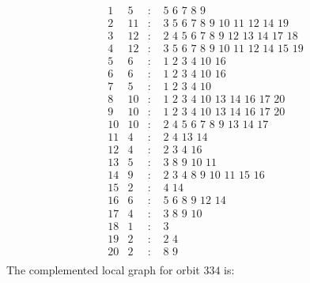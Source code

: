 \documentclass[12pt]{article}
\begin{document}
\begin{equation*}
\begin{array}{rrcl}
1&5&:&\,\,5\,\,6\,\,7\,\,8\,\,9\\
2&11&:&\,\,3\,\,5\,\,6\,\,7\,\,8\,\,9\,\,10\,\,11\,\,12\,\,14\,\,19\\
3&12&:&\,\,2\,\,4\,\,5\,\,6\,\,7\,\,8\,\,9\,\,12\,\,13\,\,14\,\,17\,\,18\\
4&12&:&\,\,3\,\,5\,\,6\,\,7\,\,8\,\,9\,\,10\,\,11\,\,12\,\,14\,\,15\,\,19\\
5&6&:&\,\,1\,\,2\,\,3\,\,4\,\,10\,\,16\\
6&6&:&\,\,1\,\,2\,\,3\,\,4\,\,10\,\,16\\
7&5&:&\,\,1\,\,2\,\,3\,\,4\,\,10\\
8&10&:&\,\,1\,\,2\,\,3\,\,4\,\,10\,\,13\,\,14\,\,16\,\,17\,\,20\\
9&10&:&\,\,1\,\,2\,\,3\,\,4\,\,10\,\,13\,\,14\,\,16\,\,17\,\,20\\
10&10&:&\,\,2\,\,4\,\,5\,\,6\,\,7\,\,8\,\,9\,\,13\,\,14\,\,17\\
11&4&:&\,\,2\,\,4\,\,13\,\,14\\
12&4&:&\,\,2\,\,3\,\,4\,\,16\\
13&5&:&\,\,3\,\,8\,\,9\,\,10\,\,11\\
14&9&:&\,\,2\,\,3\,\,4\,\,8\,\,9\,\,10\,\,11\,\,15\,\,16\\
15&2&:&\,\,4\,\,14\\
16&6&:&\,\,5\,\,6\,\,8\,\,9\,\,12\,\,14\\
17&4&:&\,\,3\,\,8\,\,9\,\,10\\
18&1&:&\,\,3\\
19&2&:&\,\,2\,\,4\\
20&2&:&\,\,8\,\,9\\
\end{array}
\end{equation*}
The complemented local graph for orbit $334$ is:
\end{document}
